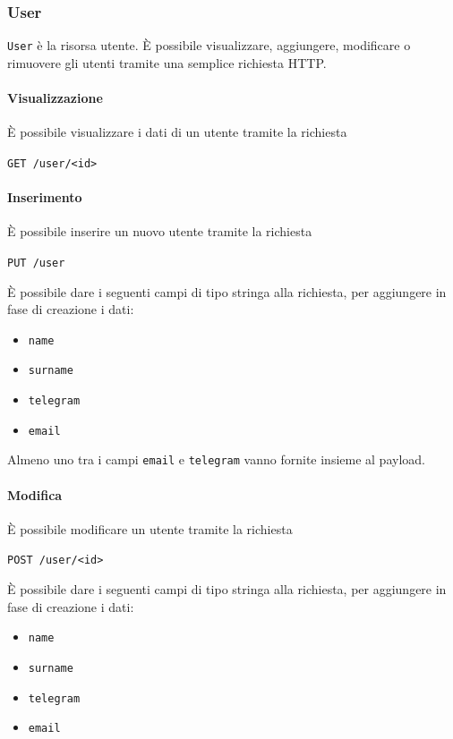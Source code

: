 \subsubsection{User}

\texttt{User} è la risorsa utente.
È possibile visualizzare, aggiungere, modificare o rimuovere gli utenti tramite una semplice
richiesta HTTP.

\paragraph{Visualizzazione}
È possibile visualizzare i dati di un utente tramite la richiesta
    \begin{center}
        \texttt{GET  /user/<id>}
    \end{center}

\paragraph{Inserimento}
È possibile inserire un nuovo utente tramite la richiesta
    \begin{center}
        \texttt{PUT /user}
    \end{center}

È possibile dare i seguenti campi di tipo stringa alla richiesta, per aggiungere in fase di creazione i dati:
\begin{itemize}[noitemsep]
    \item \texttt{name}
    \item \texttt{surname}
    \item \texttt{telegram}
    \item \texttt{email}
\end{itemize}
Almeno uno tra i campi \texttt{email} e \texttt{telegram} vanno fornite insieme al payload.

\paragraph{Modifica}

È possibile modificare un utente tramite la richiesta
\begin{center}
    \texttt{POST /user/<id>}
\end{center}

È possibile dare i seguenti campi di tipo stringa alla richiesta, per aggiungere in fase di creazione i dati:
\begin{itemize}[noitemsep]
    \item \texttt{name}
    \item \texttt{surname}
    \item \texttt{telegram}
    \item \texttt{email}
\end{itemize}


